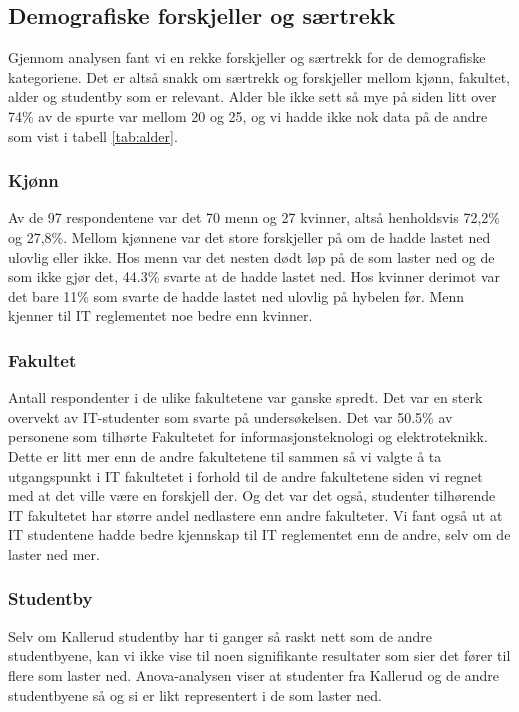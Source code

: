 \subsection{Demografiske forskjeller og særtrekk}
Gjennom analysen fant vi en rekke forskjeller og særtrekk for de demografiske kategoriene. Det er altså snakk om særtrekk og forskjeller mellom kjønn, fakultet, alder og studentby som er relevant. Alder ble ikke sett så mye på siden litt over 74\% av de spurte var mellom 20 og 25, og vi hadde ikke nok data på de andre som vist i tabell \ref{tab:alder}. 

\subsubsection{Kjønn}
Av de 97 respondentene var det 70 menn og 27 kvinner, altså henholdsvis 72,2\% og 27,8\%. Mellom kjønnene var det store forskjeller på om de hadde lastet ned ulovlig eller ikke. Hos menn var det nesten dødt løp på de som laster ned og de som ikke gjør det, 44.3\% svarte at de hadde lastet ned. Hos kvinner derimot var det bare 11\% som svarte de hadde lastet ned ulovlig på hybelen før. Menn kjenner til IT reglementet noe bedre enn kvinner. 

\subsubsection{Fakultet}
Antall respondenter i de ulike fakultetene var ganske spredt. Det var en sterk overvekt av IT-studenter som svarte på undersøkelsen. Det var 50.5\% av personene som tilhørte Fakultetet for informasjonsteknologi og elektroteknikk. Dette er litt mer enn de andre fakultetene til sammen så vi valgte å ta utgangspunkt i IT fakultetet i forhold til de andre fakultetene siden vi regnet med at det ville være en forskjell der. Og det var det også, studenter tilhørende IT fakultetet har større andel nedlastere enn andre fakulteter. Vi fant også ut at IT studentene hadde bedre kjennskap til IT reglementet enn de andre, selv om de laster ned mer.

\subsubsection{Studentby}
Selv om Kallerud studentby har ti ganger så raskt nett som de andre studentbyene, kan vi ikke vise til noen signifikante resultater som sier det fører til flere som laster ned. Anova-analysen viser at studenter fra Kallerud og de andre studentbyene så og si er likt representert i de som laster ned.

